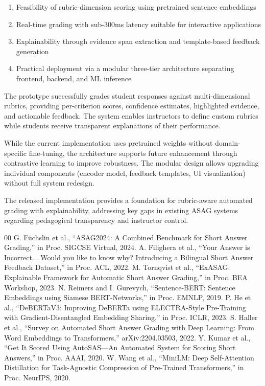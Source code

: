 \documentclass[conference]{IEEEtran}
\begin{document}
\begin{enumerate}
    \item Feasibility of rubric-dimension scoring using pretrained sentence embeddings
    \item Real-time grading with sub-300ms latency suitable for interactive applications
    \item Explainability through evidence span extraction and template-based feedback generation
    \item Practical deployment via a modular three-tier architecture separating frontend, backend, and ML inference
\end{enumerate}

The prototype successfully grades student responses against multi-dimensional rubrics, providing per-criterion scores, confidence estimates, highlighted evidence, and actionable feedback. The system enables instructors to define custom rubrics while students receive transparent explanations of their performance.

While the current implementation uses pretrained weights without domain-specific fine-tuning, the architecture supports future enhancement through contrastive learning to improve robustness. The modular design allows upgrading individual components (encoder model, feedback templates, UI visualization) without full system redesign.

The released implementation provides a foundation for rubric-aware automated grading with explainability, addressing key gaps in existing ASAG systems regarding pedagogical transparency and instructor control.

\begin{thebibliography}{00}
 G. Füchslin et al., ``ASAG2024: A Combined Benchmark for Short Answer Grading,'' in Proc. SIGCSE Virtual, 2024.
 A. Filighera et al., ``Your Answer is Incorrect... Would you like to know why? Introducing a Bilingual Short Answer Feedback Dataset,'' in Proc. ACL, 2022.
 M. Tornqvist et al., ``ExASAG: Explainable Framework for Automatic Short Answer Grading,'' in Proc. BEA Workshop, 2023.
 N. Reimers and I. Gurevych, ``Sentence-BERT: Sentence Embeddings using Siamese BERT-Networks,'' in Proc. EMNLP, 2019.
 P. He et al., ``DeBERTaV3: Improving DeBERTa using ELECTRA-Style Pre-Training with Gradient-Disentangled Embedding Sharing,'' in Proc. ICLR, 2023.
 S. Haller et al., ``Survey on Automated Short Answer Grading with Deep Learning: From Word Embeddings to Transformers,'' arXiv:2204.03503, 2022.
 Y. Kumar et al., ``Get It Scored Using AutoSAS—An Automated System for Scoring Short Answers,'' in Proc. AAAI, 2020.
 W. Wang et al., ``MiniLM: Deep Self-Attention Distillation for Task-Agnostic Compression of Pre-Trained Transformers,'' in Proc. NeurIPS, 2020.
\end{thebibliography}
\end{document}

